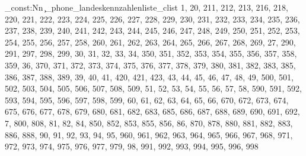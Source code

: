 \clist_const:Nn \c_phone_landeskennzahlenliste_clist {1,
20,
211,
212,
213,
216,
218,
220,
221,
222,
223,
224,
225,
226,
227,
228,
229,
230,
231,
232,
233,
234,
235,
236,
237,
238,
239,
240,
241,
242,
243,
244,
245,
246,
247,
248,
249,
250,
251,
252,
253,
254,
255,
256,
257,
258,
260,
261,
262,
263,
264,
265,
266,
267,
268,
269,
27,
290,
291,
297,
298,
299,
30,
31,
32,
33,
34,
350,
351,
352,
353,
354,
355,
356,
357,
358,
359,
36,
370,
371,
372,
373,
374,
375,
376,
377,
378,
379,
380,
381,
382,
383,
385,
386,
387,
388,
389,
39,
40,
41,
420,
421,
423,
43,
44,
45,
46,
47,
48,
49,
500,
501,
502,
503,
504,
505,
506,
507,
508,
509,
51,
52,
53,
54,
55,
56,
57,
58,
590,
591,
592,
593,
594,
595,
596,
597,
598,
599,
60,
61,
62,
63,
64,
65,
66,
670,
672,
673,
674,
675,
676,
677,
678,
679,
680,
681,
682,
683,
685,
686,
687,
688,
689,
690,
691,
692,
7,
800,
808,
81,
82,
84,
850,
852,
853,
855,
856,
86,
870,
878,
880,
881,
882,
883,
886,
888,
90,
91,
92,
93,
94,
95,
960,
961,
962,
963,
964,
965,
966,
967,
968,
971,
972,
973,
974,
975,
976,
977,
979,
98,
991,
992,
993,
994,
995,
996,
998}
